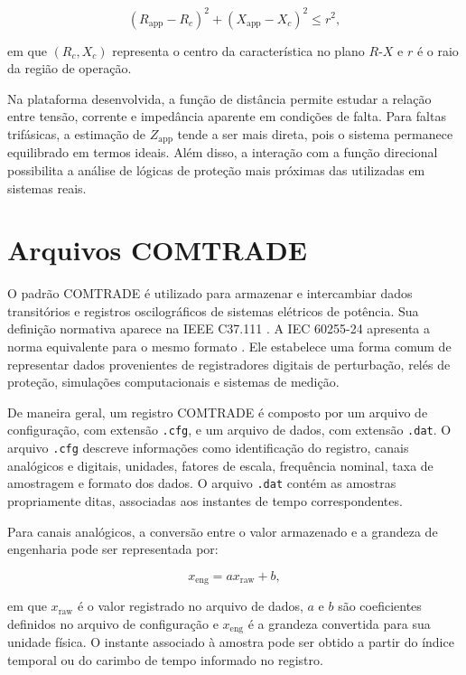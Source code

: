 \begin{equation}
  (R_{\text{app}} - R_c)^2 + (X_{\text{app}} - X_c)^2 \leq r^2,
  \label{eq:mho}
\end{equation}

\noindent em que $(R_c,X_c)$ representa o centro da característica no plano $R$-$X$ e $r$ é o raio da região de operação.

Na plataforma desenvolvida, a função de distância permite estudar a relação entre tensão, corrente e impedância aparente em condições de falta. Para faltas trifásicas, a estimação de $Z_{\text{app}}$ tende a ser mais direta, pois o sistema permanece equilibrado em termos ideais. Além disso, a interação com a função direcional possibilita a análise de lógicas de proteção mais próximas das utilizadas em sistemas reais.

\section{Arquivos COMTRADE}

O padrão COMTRADE é utilizado para armazenar e intercambiar dados transitórios e registros oscilográficos de sistemas elétricos de potência. Sua definição normativa aparece na IEEE C37.111 \cite{ieee_comtrade}. A IEC 60255-24 apresenta a norma equivalente para o mesmo formato \cite{iec_60255_24_2013}. Ele estabelece uma forma comum de representar dados provenientes de registradores digitais de perturbação, relés de proteção, simulações computacionais e sistemas de medição.

De maneira geral, um registro COMTRADE é composto por um arquivo de configuração, com extensão \texttt{.cfg}, e um arquivo de dados, com extensão \texttt{.dat}. O arquivo \texttt{.cfg} descreve informações como identificação do registro, canais analógicos e digitais, unidades, fatores de escala, frequência nominal, taxa de amostragem e formato dos dados. O arquivo \texttt{.dat} contém as amostras propriamente ditas, associadas aos instantes de tempo correspondentes.

Para canais analógicos, a conversão entre o valor armazenado e a grandeza de engenharia pode ser representada por:

\begin{equation}
  x_{\text{eng}} = a x_{\text{raw}} + b,
  \label{eq:escala-comtrade}
\end{equation}

\noindent em que $x_{\text{raw}}$ é o valor registrado no arquivo de dados, $a$ e $b$ são coeficientes definidos no arquivo de configuração e $x_{\text{eng}}$ é a grandeza convertida para sua unidade física. O instante associado à amostra pode ser obtido a partir do índice temporal ou do carimbo de tempo informado no registro.

